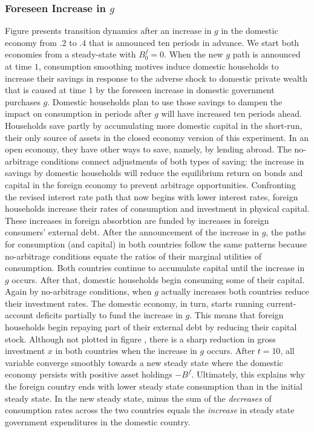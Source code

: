 \subsubsection{Foreseen Increase in $g$}

Figure  presents  transition dynamics after an increase in $g$   in the
domestic economy from $.2$ to $.4$ that is announced ten periods in advance. We start both economies
 from a steady-state with $B_{0}^f = 0$. When the new $g$ path  is
announced at time $1$, consumption smoothing motives induce domestic households to increase
their savings in response to the  adverse shock to domestic private
wealth that is caused at time $1$ by the foreseen increase
in domestic government purchases $g$.  Domestic households plan to  use those savings to  dampen the impact on
consumption in periods after $g$ will have increased ten periods ahead. Households  save partly by accumulating more
domestic capital in the short-run, their only source of assets in the closed economy version of this experiment.
 In an open economy, they have other ways to save, namely,  by lending abroad.
 The no-arbitrage conditions connect adjustments of both types of saving: the increase in
savings  by domestic households will reduce the equilibrium return
on bonds and capital in the foreign economy to prevent arbitrage
opportunities. Confronting  the revised  interest rate path that now begins with lower
interest rates, foreign households increase their rates of consumption and
investment in physical capital. These increases in foreign absorbtion are funded
by  increases in foreign consumers' external debt. After the announcement of
the increase in $g$, the paths for consumption (and capital) in both countries follow
the same patterns because no-arbitrage conditions equate the ratios of their marginal utilities of consumption.
 Both countries continue to accumulate capital until the
increase in $g$ occurs. After that,  domestic households begin consuming some of their
 capital. Again by no-arbitrage conditions,  when  $g$  actually  increases both countries reduce their
investment rates. The domestic economy, in turn, starts
running current-account deficits partially to fund the increase in $g$. This
means that foreign households begin repaying part of their external debt by
reducing their  capital stock. Although not plotted in  figure , there is
a sharp reduction in gross investment $x$ in both countries when the increase in $g$ occurs. After
$t=10$, all variable converge smoothly towards a new steady state where the
domestic economy persists with positive asset holdings $- B^f$. Ultimately, this
explains why the foreign country ends with lower steady state consumption
than in  the initial steady state.  In the new steady state, minus the sum of the {\it decreases\/} of
consumption rates across the two countries equals the {\it increase} in steady state government expenditures
in the domestic country.


